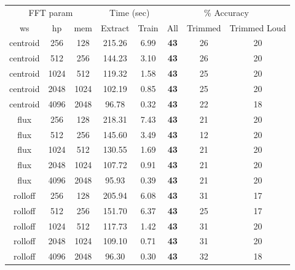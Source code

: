 \documentclass[12pt,oneside]{book}
\begin{document}
\begin{table}
\begin{tabular}{|c|c|c|c|c|c|c|c|}
\hline
\multicolumn{3}{|c|}{FFT param} & \multicolumn{2}{c|}{Time (sec)} & \multicolumn{3}{c|}{\% Accuracy} \\
\hhline{|-|-|-|-|-|-|-|-|}
ws & hp & mem & Extract & Train & All & Trimmed & Trimmed Loud \\
\hhline{|=|=|=|=|=|=|=|=|}
centroid & 256 & 128       &   215.26  &    6.99  &  \textbf{43}  & 26 & 20 \\
centroid & 512 & 256       &   144.23  &    3.10  &  \textbf{43}  & 26 & 20 \\
centroid & 1024 & 512      &   119.32  &    1.58  &  \textbf{43}  & 25 & 20 \\
centroid & 2048 & 1024     &   102.19  &    0.85  &  \textbf{43}  & 25 & 20 \\
centroid & 4096 & 2048     &    96.78  &    0.32  &  \textbf{43}  & 22 & 18 \\
\hline
flux & 256 & 128           &   218.31  &    7.43  &  \textbf{43}  & 21 & 20 \\
flux & 512 & 256           &   145.60  &    3.49  &  \textbf{43}  & 12 & 20 \\
flux & 1024 & 512          &   130.55  &    1.69  &  \textbf{43}  & 21 & 20 \\
flux & 2048 & 1024         &   107.72  &    0.91  &  \textbf{43}  & 21 & 20 \\
flux & 4096 & 2048         &    95.93  &    0.39  &  \textbf{43}  & 21 & 20 \\
\hline
rolloff & 256 & 128        &   205.94  &    6.08  &  \textbf{43}  & 31 & 17 \\
rolloff & 512 & 256        &   151.70  &    6.37  &  \textbf{43}  & 25 & 17 \\
rolloff & 1024 & 512       &   117.73  &    1.42  &  \textbf{43}  & 31 & 20 \\
rolloff & 2048 & 1024      &   109.10  &    0.71  &  \textbf{43}  & 31 & 20 \\
rolloff & 4096 & 2048      &    96.30  &    0.30  &  \textbf{43}  & 32 & 18 \\

\end{tabular}
\end{table}
\end{document}
